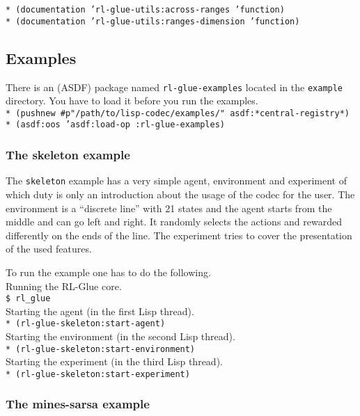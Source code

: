 \documentclass[11pt,a4paper,dvipdfm]{article}
\newcommand{\prompttext}[1]{\texttt{#1}}
\newcommand{\shprompt}[1]{\prompttext{\$ #1}}
\newcommand{\lispprompt}[1]{\prompttext{* #1}}
\begin{document}
\lispprompt{(documentation 'rl-glue-utils:across-ranges 'function)} \\
\lispprompt{(documentation 'rl-glue-utils:ranges-dimension 'function)}

\hypertarget{examples}{\subsection{Examples}}

There is an (ASDF) package named \prompttext{rl-glue-examples} located
in the \prompttext{example} directory. You have to load it before you
run the examples. \\
\lispprompt{(pushnew \#p"/path/to/lisp-codec/examples/" asdf:*central-registry*)} \\
\lispprompt{(asdf:oos 'asdf:load-op :rl-glue-examples)}

\subsubsection{The skeleton example}

The \prompttext{skeleton} example has a very simple agent, environment
and experiment of which duty is only an introduction about the usage of
the codec for the user. The environment is a ``discrete line'' with 21
states and the agent starts from the middle and can go left and right.
It randomly selects the actions and rewarded differently on the ends of
the line. The experiment tries to cover the presentation of the used
features.

To run the example one has to do the following. \\
Running the RL-Glue core. \\
\shprompt{rl\_glue} \\
Starting the agent (in the first Lisp thread). \\
\lispprompt{(rl-glue-skeleton:start-agent)} \\
Starting the environment (in the second Lisp thread). \\
\lispprompt{(rl-glue-skeleton:start-environment)} \\
Starting the experiment (in the third Lisp thread). \\
\lispprompt{(rl-glue-skeleton:start-experiment)}

\subsubsection{The mines-sarsa example}
\end{document}
